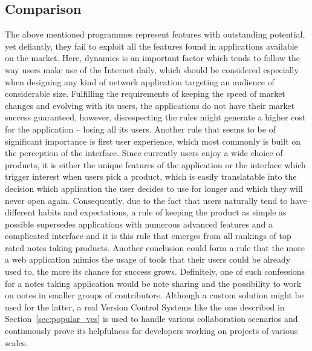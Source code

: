 \subsection{Comparison}\label{subsec:vcs_comparison}
The above mentioned programmes represent features with outstanding potential, yet defiantly, they fail to exploit all the features found in applications available on the market. Here, dynamics is an important factor which tends to follow the way users make use of the Internet daily, which should be considered especially when designing any kind of network application targeting an audience of considerable size. Fulfilling the requirements of keeping the speed of market changes and evolving with its users, the applications do not have their market success guaranteed, however, disrespecting the rules might generate a higher cost for the application -- losing all its users. Another rule that seems to be of significant importance is first user experience, which most commonly is built on the perception of the interface. Since currently users enjoy a wide choice of products, it is either the unique features of the application or the interface which trigger interest when users pick a product, which is easily translatable into the decision which application the user decides to use for longer and which they will never open again. Consequently, due to the fact that users naturally tend to have different habits and expectations, a rule of keeping the product as simple as possible supersedes applications with numerous advanced features and a complicated interface and it is this rule that emerges from all rankings of top rated notes taking products. Another conclusion could form a rule that the more a web application mimics the usage of tools that their users could be already used to, the more its chance for success grows. Definitely, one of such confessions for a notes taking application would be note sharing and the possibility to work on notes in smaller groups of contributors. Although a custom solution might be used for the latter, a real Version Control Systems like the one described in Section~\ref{sec:popular_vcs} is used to handle various collaboration scenarios and continuously prove its helpfulness for developers working on projects of various scales. 


